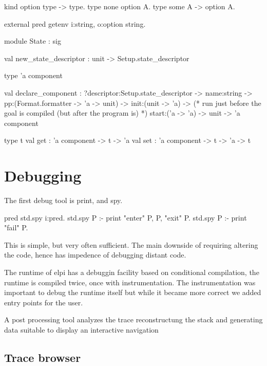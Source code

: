 \documentclass[a4paper, 11pt]{book}
\begin{document}
\begin{elpicode}
kind option type -> type.
type none option A.
type some A -> option A.

external pred getenv i:string, o:option string.
\end{elpicode}

\begin{ocamlcode}
module State : sig

  val new_state_descriptor : unit -> Setup.state_descriptor

  type 'a component

  val declare_component :
    ?descriptor:Setup.state_descriptor ->
    name:string ->
    pp:(Format.formatter -> 'a -> unit) ->
    init:(unit -> 'a) ->
    (* run just before the goal is compiled (but after the program is) *)
    start:('a -> 'a) ->
    unit ->
      'a component
  
  type t
  val get : 'a component -> t -> 'a
  val set : 'a component -> t -> 'a -> t
\end{ocamlcode}


\section{Debugging}

The first debug tool is print, and spy.

\begin{elpicode}
pred std.spy i:pred.
std.spy P :- print "enter" P, P, "exit" P.
std.spy P :- print "fail" P.
\end{elpicode}

This is simple, but very often sufficient.
The main downside of requiring altering the code, hence has impedence
of debugging distant code.

The runtime of elpi has a debuggin facility based on conditional compilation,
the runtime is compiled twice, once with instrumentation.
The instrumentation was important to debug the runtime itself
but while it became more correct we added entry points for the user.

A post processing tool analyzes the trace reconstructung the
stack and generating data suitable to display an interactive navigation

\subsection{Trace browser}
\end{document}
